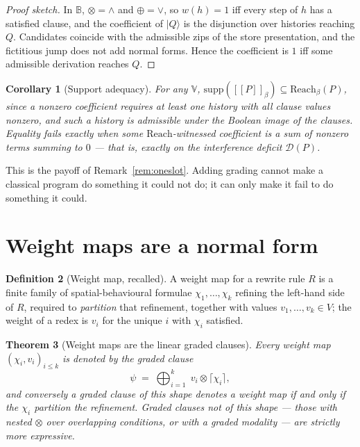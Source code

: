 \documentclass[11pt,a4paper]{article}
\theoremstyle{plain}
\newtheorem{theorem}{Theorem}[section]
\newtheorem{corollary}[theorem]{Corollary}
\theoremstyle{definition}
\newtheorem{definition}[theorem]{Definition}
\theoremstyle{remark}
\newcommand{\sem}[1]{[\![#1]\!]}
\newcommand{\V}{\mathbb{V}}
\newcommand{\Bool}{\mathbb{B}}
\newcommand{\Reach}{\mathrm{Reach}}
\newcommand{\supp}{\mathrm{supp}}
\newcommand{\tensorv}{\otimes}
\newcommand{\sumv}{\oplus}
\newcommand{\crisp}[1]{\lceil #1 \rceil}
\begin{document}
\begin{proof}[Proof sketch]
In $\Bool$, $\tensorv = \wedge$ and $\sumv = \vee$, so $w(h) = 1$ iff every step
of $h$ has a satisfied clause, and the coefficient of $\lvert Q\rangle$ is the
disjunction over histories reaching $Q$. Candidates coincide with the admissible
zips of the store presentation, and the fictitious jump does not add normal
forms. Hence the coefficient is $1$ iff some admissible derivation reaches $Q$.
\end{proof}

\begin{corollary}[Support adequacy]\label{cor:adequacy}
For any $\V$, $\supp(\sem{P}_\beta) \subseteq \Reach_\beta(P)$, since a nonzero
coefficient requires at least one history with all clause values nonzero, and
such a history is admissible under the Boolean image of the clauses. Equality
fails exactly when some $\Reach$-witnessed coefficient is a sum of nonzero terms
summing to $0$ --- that is, exactly on the interference deficit
$\mathcal{D}(P)$.
\end{corollary}

This is the payoff of Remark~\ref{rem:oneslot}. Adding grading cannot make a
classical program do something it could not do; it can only make it fail to do
something it could.

\section{Weight maps are a normal form}\label{sec:weightmaps}

\begin{definition}[Weight map, recalled]\label{def:wmap}
A weight map for a rewrite rule $R$ is a finite family of spatial-behavioural
formulae $\chi_1,\dots,\chi_k$ refining the left-hand side of $R$, required to
\emph{partition} that refinement, together with values $v_1,\dots,v_k \in V$;
the weight of a redex is $v_i$ for the unique $i$ with $\chi_i$ satisfied.
\end{definition}

\begin{theorem}[Weight maps are the linear graded clauses]\label{thm:dnf}
Every weight map $(\chi_i,v_i)_{i\leq k}$ is denoted by the graded clause
\[
  \psi \;=\; \bigoplus_{i=1}^{k} \; v_i \tensorv \crisp{\chi_i},
\]
and conversely a graded clause of this shape denotes a weight map if and only if
the $\chi_i$ partition the refinement. Graded clauses not of this shape ---
those with nested $\tensorv$ over overlapping conditions, or with a graded
modality --- are strictly more expressive.
\end{theorem}
\end{document}
